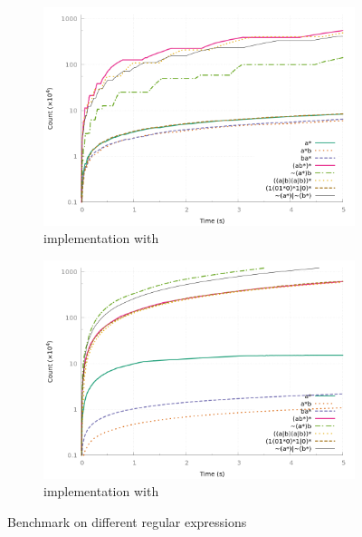 \begin{figure}[h]
  \centering
  \begin{subfigure}[t]{0.45\linewidth}
    \centering
    \includegraphics[height=0.66\linewidth]{measure/haskell_langs.png}
    \caption{\haskell implementation with }
    \label{bench:haskell:langs}
  \end{subfigure}
  \begin{subfigure}[t]{0.45\linewidth}
    \centering
    \includegraphics[height=0.66\linewidth]{measure/ocaml_langs.png}
    \caption{\ocaml implementation with }
    \label{bench:ocaml:langs}
  \end{subfigure}
  \caption{Benchmark on different regular expressions}
  \label{bench:langs}
\end{figure}

